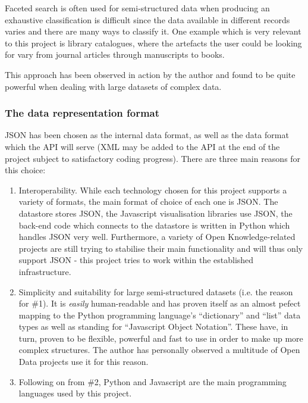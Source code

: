 \documentclass[11pt,fleqn,twoside]{article}
\begin{document}
Faceted search is often used for semi-structured data when producing an exhaustive classification is difficult since the data available in different records varies and there are many ways to classify it. One example which is very relevant to this project is library catalogues, where the artefacts the user could be looking for vary from journal articles through manuscripts to books.

This approach has been observed in action by the author and found to be quite powerful when dealing with large datasets of complex data.

\subsubsection{The data representation format}
JSON has been chosen as the internal data format, as well as the data format which the API will serve (XML may be added to the API at the end of the project subject to satisfactory coding progress). There are three main reasons for this choice:

\begin{enumerate}
	\item Interoperability. While each technology chosen for this project supports a variety of formats, the main format of choice of each one is JSON. The datastore stores JSON, the Javascript visualisation libraries use JSON, the back-end code which connects to the datastore is written in Python which handles JSON very well. Furthermore, a variety of Open Knowledge-related projects are still trying to stabilise their main functionality and will thus only support JSON - this project tries to work within the established infrastructure.
	\item Simplicity and suitability for large semi-structured datasets (i.e. the reason for \#1). It is \emph{easily} human-readable \cite{json-vs-xml} and has proven itself as an almost pefect mapping to the Python programming language's ``dictionary'' and ``list'' data types as well as standing for ``Javascript Object Notation''. These have, in turn, proven to be flexible, powerful and fast to use in order to make up more complex structures. The author has personally observed a multitude of Open Data projects use it for this reason.
	\item Following on from \#2, Python and Javascript are the main programming languages used by this project.
\end{enumerate}


\end{document}
